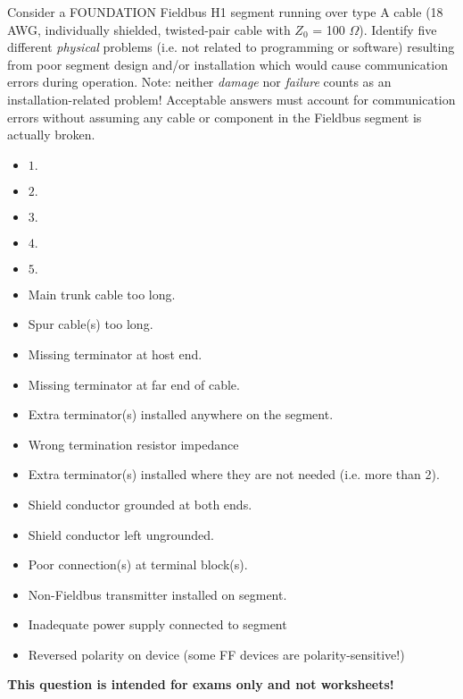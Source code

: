 

Consider a FOUNDATION Fieldbus H1 segment running over type A cable (18 AWG, individually shielded, twisted-pair cable with $Z_0$ = 100 $\Omega$).  Identify five different {\it physical} problems (i.e. not related to programming or software) resulting from poor segment design and/or installation which would cause communication errors during operation.  Note: neither {\it damage} nor {\it failure} counts as an installation-related problem!  Acceptable answers must account for communication errors without assuming any cable or component in the Fieldbus segment is actually broken.

\vskip 50pt 

\begin{itemize}
\item{$1.$}
\vskip 50pt 
\item{$2.$} 
\vskip 50pt 
\item{$3.$} 
\vskip 50pt 
\item{$4.$} 
\vskip 50pt 
\item{$5.$} 
\end{itemize}







\begin{itemize}
\item{} Main trunk cable too long.
\vskip 5pt 
\item{} Spur cable(s) too long.
\vskip 5pt 
\item{} Missing terminator at host end.
\vskip 5pt 
\item{} Missing terminator at far end of cable.
\vskip 5pt 
\item{} Extra terminator(s) installed anywhere on the segment.
\vskip 5pt 
\item{} Wrong termination resistor impedance
\vskip 5pt 
\item{} Extra terminator(s) installed where they are not needed (i.e. more than 2).
\vskip 5pt 
\item{} Shield conductor grounded at both ends.
\vskip 5pt 
\item{} Shield conductor left ungrounded.
\vskip 5pt 
\item{} Poor connection(s) at terminal block(s).
\vskip 5pt 
\item{} Non-Fieldbus transmitter installed on segment.
\vskip 5pt 
\item{} Inadequate power supply connected to segment
\vskip 5pt 
\item{} Reversed polarity on device (some FF devices are polarity-sensitive!)
\end{itemize}








{\bf This question is intended for exams only and not worksheets!}



